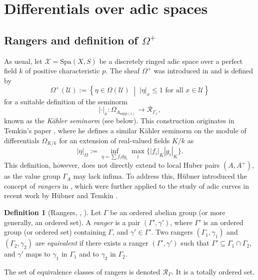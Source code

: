 \documentclass{amsart}
\def\Spa{\textrm{Spa}}
\theoremstyle{definition}
\newtheorem{definition}[theorem]{Definition}
\newcommand\supp{\mathrm{supp}}
\numberwithin{equation}{section}
\begin{document}
\section{Differentials over adic spaces}
\subsection{Rangers and definition of \texorpdfstring{$\Omega^+$}{Omega⁺}}
As usual, let \( \mathcal{X} = \Spa(X, S) \) be a discretely ringed adic space over a perfect field $k$ of positive characteristic $p$. The sheaf \( \Omega^+ \) was introduced in \cite{LogDiff} and is defined by
\[
\Omega^+(\mathcal{U}) := \left\{ \eta \in \Omega(\mathcal{U}) \;\middle|\; |\eta|_x \leq 1 \text{ for all } x \in \mathcal{U} \right\}
\]
for a suitable definition of the seminorm
\[
|\cdot|_x : \Omega_{A_{\supp(x)}} \to \mathcal{R}_{\Gamma_x},
\]
known as the \emph{Kähler seminorm} (see below). This construction originates in Temkin’s paper \cite{TemkinMetrization}, where he defines a similar Kähler seminorm on the module of differentials \( \Omega_{K/k} \) for an extension of real-valued fields \( K/k \) as
\[
|\eta|_\Omega:= \inf_{\eta=\sum f_idg_i}\max_i\{|f_i|_{K}|g_i|_K\}.
\]
This definition, however, does not directly extend to local Huber pairs \( (A, A^+) \), as the value group \( \Gamma_A \) may lack infima. To address this, Hübner introduced the concept of \emph{rangers} in \cite[§5]{LogDiff}, which were further applied to the study of adic curves in recent work by Hübner and Temkin \cite[2.1.5]{HTCurves}.

\begin{definition}[{Rangers, \cite[§5]{LogDiff}, \cite[2.1.5]{HTCurves}}]
	Let \( \Gamma \) be an ordered abelian group (or more generally, an ordered set). A \emph{ranger} is a pair \( (\Gamma', \gamma') \), where \( \Gamma' \) is an ordered group (or ordered set) containing \( \Gamma \), and \( \gamma' \in \Gamma' \). Two rangers \( (\Gamma_1, \gamma_1) \) and \( (\Gamma_2, \gamma_2) \) are \emph{equivalent} if there exists a ranger \( (\Gamma', \gamma') \) such that \( \Gamma' \subseteq \Gamma_1 \cap \Gamma_2 \), and \( \gamma' \) maps to \( \gamma_1 \) in \( \Gamma_1 \) and to \( \gamma_2 \) in \( \Gamma_2 \).

	
	The set of equivalence classes of rangers is denoted \( \mathcal{R}_\Gamma \). It is  a  totally ordered set.

\end{definition}
\end{document}
